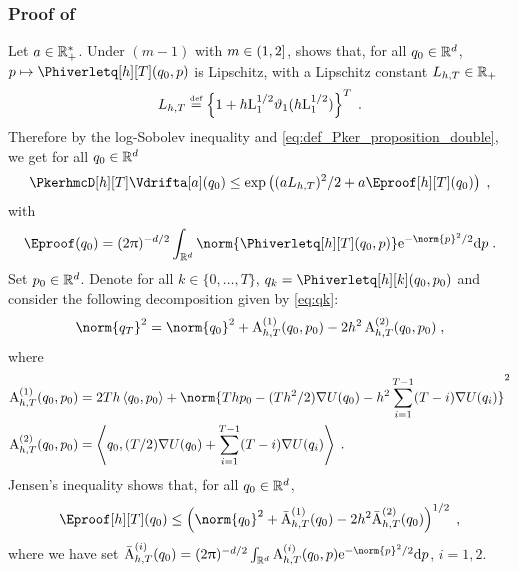 \subsubsection{Proof of }
\label{sec:proof-crefl-2}


Let $a \in \mathbb{R}_+^*$. Under $(m-1)$ with $m \in \left(1,2\right]$,    shows that, for all $q_0 \in \mathbb{R}^d$,
$\p \mapsto \Phiverletq[h][T](\q_0,\p)$ is Lipschitz, with a Lipschitz constant $L_{h,T} \in \mathbb{R}_+$
\begin{equation}
\label{eq:definition-lipshitz}
L_{h,T} \overset{\text{\tiny def}} = \left\lbrace 1+h \mathrm{L}_1^{1/2} \vartheta_1(h \mathrm{L}_1^{1/2}) \right\rbrace^{T} \;.
\end{equation}
Therefore by the log-Sobolev inequality \cite[Proposition 5.5.1, (5.4.1)]{bakry:gentil:ledoux:2014} and \eqref{eq:def_Pker_proposition_double}, we get for all $q_0 \in \mathbb{R}^d$
\begin{equation}
\PkerhmcD[h][T] \Vdrifta[\a](\q_0) \leq \exp\parenthese{(aL_{h,T})^2/2 + a \Eproof[h][T](\q_0)} \eqsp,
\end{equation}
with
\begin{equation}
\Eproof(\q_0) = (2\uppi)^{-d/2} \int_{\rset^d} \norm{\Phiverletq[h][T](\q_0,\p)} \rme^{-\norm{\p}^2/2} \rmd \p \eqsp.
\end{equation}
Set $p_0 \in \mathbb{R}^d$.
Denote for all $k \in \{0,\ldots,T\}$, $q_k =
\Phiverletq[h][k](\q_0,\p_0)$ and consider the following decomposition given by  \eqref{eq:qk}:
\begin{equation}
\label{eq:drift_uhmc_3}
\norm{\q_T}^2  =  \norm{\q_0}^2 + \operatorname{A}^{(1)}_{h,T}(\q_0,\p_0) -2h^2 \operatorname{A}^{(2)}_{h,T}(\q_0,\p_0) \eqsp,
\end{equation}
where
\begin{align}
\operatorname{A}^{(1)}_{h,T}(\q_0,\p_0) & = 2Th \ps{\q_0}{ \p_0} + \norm{ Th\p_0-(Th^2/2) \nabla \F(\q_0)-h^2 \sum_{i=1}^{T-1}(T-i)\nabla \F (\q_i)}^2 \\
\operatorname{A}^{(2)}_{h,T}(\q_0, \p_0) & = \ps{\q_0}{ (T/2) \nabla \F(\q_0)+ \sum_{i=1}^{T-1}(T-i)\nabla \F (\q_i)} \eqsp.
\end{align}
Jensen's inequality shows that, for all $q_0 \in \mathbb{R}^d$,
\[
\Eproof[h][T](\q_0) \leq \left( \norm{\q_0}^2 + \bar{\operatorname{A}}^{(1)}_{h,T}(\q_0) - 2 h^2 \bar{\operatorname{A}}^{(2)}_{h,T}(\q_0) \right)^{1/2} \eqsp,
\]
where we have set $\bar{\operatorname{A}}_{h,T}^{(i)}(\q_0)= (2\uppi)^{-d/2} \int_{\rset^d} \operatorname{A}_{h,T}^{(i)}(\q_0,\p) \rme^{-\norm{\p}^2/2} \rmd \p$, $i=1,2$.
